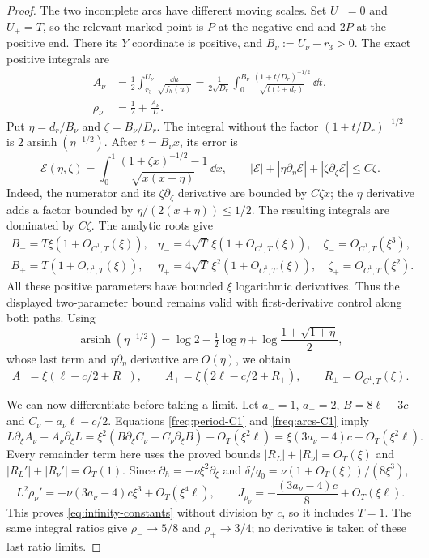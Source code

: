 \begin{proof}
The two incomplete arcs have different moving scales.  Set $U_-=0$
and $U_+=T$, so the relevant marked point is $P$ at the negative
end and $2P$ at the positive end.  There its $Y$ coordinate is
positive, and $B_\nu:=U_\nu-r_3>0$.  The exact positive integrals are
\begin{equation}\label{freq:infinity-arcs}
 \begin{aligned}
 A_\nu&=\frac12\int_{r_3}^{U_\nu}\frac{\dd u}{\sqrt{f_h(u)}}
 =\frac1{2\sqrt{D_r}}\int_0^{B_\nu}
 \frac{(1+t/D_r)^{-1/2}}{\sqrt{t(t+d_r)}}\,\dd t,\\
 \rho_\nu&=\frac12+\frac{A_\nu}{L}.
 \end{aligned}
\end{equation}
Put $\eta=d_r/B_\nu$ and $\zeta=B_\nu/D_r$.
The integral without the factor $(1+t/D_r)^{-1/2}$ is
$2\operatorname{arsinh}(\eta^{-1/2})$.  After $t=B_\nu x$, its
error is
\[
 \mathcal E(\eta,\zeta)=\int_0^1
 \frac{(1+\zeta x)^{-1/2}-1}{\sqrt{x(x+\eta)}}\,\dd x,
 \qquad
 |\mathcal E|+|\eta\partial_\eta\mathcal E|
       +|\zeta\partial_\zeta\mathcal E|\le C\zeta.
\]
Indeed, the numerator and its $\zeta\partial_\zeta$ derivative
are bounded by $C\zeta x$; the $\eta$ derivative adds a factor
bounded by $\eta/(2(x+\eta))\le1/2$.
The resulting integrals are dominated by $C\zeta$.
The analytic roots give
\[
 \begin{array}{ll}
 B_-=T\xi(1+O_{C^1,T}(\xi)),&
 \eta_-=4\sqrt T\,\xi(1+O_{C^1,T}(\xi)),\quad
 \zeta_-=O_{C^1,T}(\xi^3),\\
 B_+=T(1+O_{C^1,T}(\xi)),&
 \eta_+=4\sqrt T\,\xi^2(1+O_{C^1,T}(\xi)),\quad
 \zeta_+=O_{C^1,T}(\xi^2).
 \end{array}
\]
All these positive parameters have bounded $\xi$ logarithmic
derivatives.  Thus the displayed two-parameter bound remains valid
with first-derivative control along both paths.
Using
\[
 \operatorname{arsinh}(\eta^{-1/2})=
 \log2-\tfrac12\log\eta+
 \log\frac{1+\sqrt{1+\eta}}2,
\]
whose last term and $\eta\partial_\eta$ derivative are $O(\eta)$,
we obtain
\begin{equation}\label{freq:arcs-C1}
 A_-=\xi(\ell-c/2+R_-),\qquad
 A_+=\xi(2\ell-c/2+R_+),\qquad
 R_\pm=O_{C^1,T}(\xi).
\end{equation}

We can now differentiate before taking a limit.  Let $a_-=1$,
$a_+=2$, $B=8\ell-3c$ and $C_\nu=a_\nu\ell-c/2$.
Equations \eqref{freq:period-C1} and \eqref{freq:arcs-C1} imply
\[
 L\partial_\xi A_\nu-A_\nu\partial_\xi L
 =\xi^2(B\partial_\xi C_\nu-C_\nu\partial_\xi B)
       +O_T(\xi^2\ell)
 =\xi(3a_\nu-4)c+O_T(\xi^2\ell).
\]
Every remainder term here uses the proved bounds
$|R_L|+|R_\nu|=O_T(\xi)$ and
$|R_L'|+|R_\nu'|=O_T(1)$.
Since $\partial_h=-\nu\xi^2\partial_\xi$ and
$\delta/q_0=\nu(1+O_T(\xi))/(8\xi^3)$,
\[
 L^2\rho_\nu'=-\nu(3a_\nu-4)c\xi^3+O_T(\xi^4\ell),
 \qquad
 J_{\rho_\nu}=-\frac{(3a_\nu-4)c}{8}+O_T(\xi\ell).
\]
This proves \eqref{eq:infinity-constants} without division by $c$,
so it includes $T=1$.  The same integral ratios give
$\rho_-\to5/8$ and $\rho_+\to3/4$; no derivative is taken of these
last ratio limits.
\end{proof}

